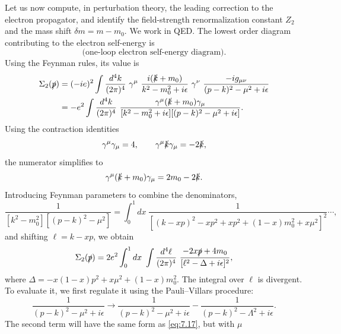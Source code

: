 Let us now compute, in perturbation theory, the leading correction to the
electron propagator, and identify the field-strength renormalization constant
$Z_2$ and the mass shift $\delta m = m - m_0$.  We work in QED.  The lowest
order diagram contributing to the electron self-energy is
\begin{equation}
  \text{(one-loop electron self-energy diagram)} .
  \label{eq:7.15}
\end{equation}
Using the Feynman rules, its value is
\begin{equation}
  \begin{aligned}
    \Sigma_2(\slashed{p}) &= (-ie)^2\int \frac{d^4k}{(2\pi)^4}\
      \gamma^\mu\ \frac{i(\slashed{k}+m_0)}{k^2-m_0^2+i\epsilon}\
      \gamma^\nu\ \frac{-ig_{\mu\nu}}{(p-k)^2-\mu^2+i\epsilon}\\
    &= -e^2\int \frac{d^4k}{(2\pi)^4}\
      \frac{\gamma^\mu(\slashed{k}+m_0)\gamma_\mu}
        {[k^2-m_0^2+i\epsilon][(p-k)^2-\mu^2+i\epsilon]} .
  \end{aligned}
  \label{eq:7.16}
\end{equation}
Using the contraction identities
\begin{equation}
  \gamma^\mu\gamma_\mu = 4,\qquad
  \gamma^\mu\slashed{k}\gamma_\mu = -2\slashed{k},
\end{equation}
the numerator simplifies to
\begin{equation}
  \gamma^\mu(\slashed{k}+m_0)\gamma_\mu = 2m_0 - 2\slashed{k} .
\end{equation}
Introducing Feynman parameters to combine the denominators,
\begin{equation}
  \frac{1}{[k^2-m_0^2][(p-k)^2-\mu^2]}
  = \int_0^1 dx\ \frac{1}{[(k-xp)^2 - xp^2 + xp^2 + (1-x)m_0^2 + x\mu^2]^2}
  \cdots ,
\end{equation}
and shifting $\ell = k - xp$, we obtain
\begin{equation}
  \Sigma_2(\slashed{p}) = 2e^2\int_0^1 dx\ \int
    \frac{d^4\ell}{(2\pi)^4}\ \frac{-2x\slashed{p} + 4m_0}
      {[\ell^2 - \Delta + i\epsilon]^2},
  \label{eq:7.17}
\end{equation}
where $\Delta = -x(1-x)p^2 + x\mu^2 + (1-x)m_0^2$.  The integral over
$\ell$ is divergent.  To evaluate it, we first regulate it using the
Pauli--Villars procedure:
\begin{equation}
  \frac{1}{(p-k)^2-\mu^2+i\epsilon}
    \to \frac{1}{(p-k)^2-\mu^2+i\epsilon}
      - \frac{1}{(p-k)^2-\Lambda^2+i\epsilon} .
\end{equation}
The second term will have the same form as \eqref{eq:7.17}, but with $\mu$
